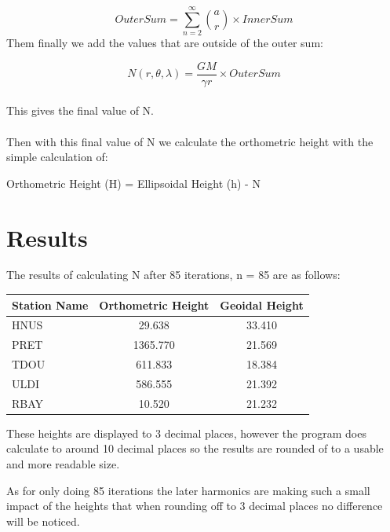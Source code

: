 \documentclass[12pt,a4paper]{article}
\begin{document}
	\begin{equation}
		OuterSum = \sum_{n=2}^{\infty} \binom{a}{r} \times InnerSum
	\end{equation}
	\newpage
	Them finally we add the values that are outside of the outer sum:
	
	\begin{equation}
		N(r, \theta, \lambda) = \frac{GM}{\gamma r} \times OuterSum
	\end{equation}
	\\
	This gives the final value of N.\\
	\\
	Then with this final value of N we calculate the orthometric height with the simple calculation of:
	
	\begin{center}
		Orthometric Height (H) = Ellipsoidal Height (h) - N
	\end{center}
	
	\newpage
	\section{Results}
	The results of calculating N after 85 iterations, n = 85 are as follows: 
	
	\begin{center}
		\begin{tabular}{ | l | c | c |}
			\hline
			Station Name & Orthometric Height & Geoidal Height  \\ \hline
			HNUS &   29.638 & 33.410\\ \hline
			PRET & 1365.770 & 21.569\\ \hline
			TDOU &  611.833 & 18.384\\ \hline
			ULDI &  586.555 & 21.392\\ \hline
			RBAY &   10.520 & 21.232\\
			\hline
			
		\end{tabular}
	\end{center}
	
	These heights are displayed to 3 decimal places, however the program does calculate to around 10 decimal places so the results are rounded of to a usable and more readable size.
	
	As for only doing 85 iterations the later harmonics are making such a small impact of the heights that when rounding off to 3 decimal places no difference will be noticed.
	
	
	
	
	
	
	
	
	
	
	
\end{document}
